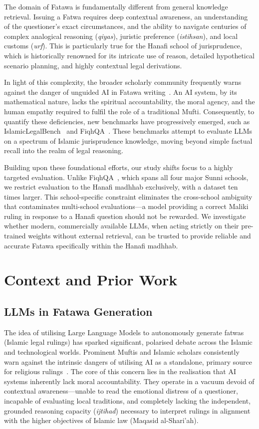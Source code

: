 \documentclass[runningheads]{llncs}
\begin{document}
The domain of Fatawa is fundamentally different from general knowledge retrieval. Issuing a Fatwa requires deep contextual awareness, an understanding of the questioner's exact circumstances, and the ability to navigate centuries of complex analogical reasoning (\textit{qiyas}), juristic preference (\textit{istihsan}), and local customs (\textit{urf}). This is particularly true for the Hanafi school of jurisprudence, which is historically renowned for its intricate use of reason, detailed hypothetical scenario planning, and highly contextual legal derivations.

In light of this complexity, the broader scholarly community frequently warns against the danger of unguided AI in Fatawa writing~\cite{dangerai2025}. An AI system, by its mathematical nature, lacks the spiritual accountability, the moral agency, and the human empathy required to fulfil the role of a traditional Mufti. Consequently, to quantify these deficiencies, new benchmarks have progressively emerged, such as IslamicLegalBench~\cite{elmahjub2026islamiclegalbench} and FiqhQA~\cite{atif2025fiqhqa}. These benchmarks attempt to evaluate LLMs on a spectrum of Islamic jurisprudence knowledge, moving beyond simple factual recall into the realm of legal reasoning.

Building upon these foundational efforts, our study shifts focus to a highly targeted evaluation. Unlike FiqhQA~\cite{atif2025fiqhqa}, which spans all four major Sunni schools, we restrict evaluation to the Hanafi madhhab exclusively, with a dataset ten times larger. This school-specific constraint eliminates the cross-school ambiguity that contaminates multi-school evaluations---a model providing a correct Maliki ruling in response to a Hanafi question should not be rewarded. We investigate whether modern, commercially available LLMs, when acting strictly on their pre-trained weights without external retrieval, can be trusted to provide reliable and accurate Fatawa specifically within the Hanafi madhhab.

\section{Context and Prior Work}

\subsection{LLMs in Fatawa Generation}
The idea of utilising Large Language Models to autonomously generate fatwas (Islamic legal rulings) has sparked significant, polarised debate across the Islamic and technological worlds. Prominent Muftis and Islamic scholars consistently warn against the intrinsic dangers of utilising AI as a standalone, primary source for religious rulings~\cite{dangerai2025}. The core of this concern lies in the realisation that AI systems inherently lack moral accountability. They operate in a vacuum devoid of contextual awareness---unable to read the emotional distress of a questioner, incapable of evaluating local traditions, and completely lacking the independent, grounded reasoning capacity (\textit{ijtihad}) necessary to interpret rulings in alignment with the higher objectives of Islamic law (Maqasid al-Shari'ah).
\end{document}
